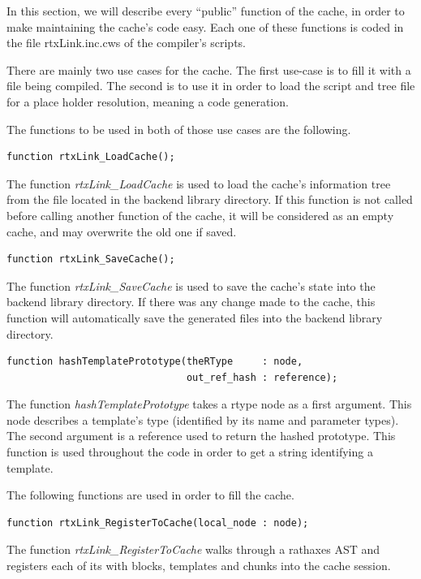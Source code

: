 \documentclass[american]{rtxreport}
\begin{document}
In this section, we will describe every ``public'' function of the cache, in
order to make maintaining the cache's code easy. Each one of these functions is
coded in the file rtxLink.inc.cws of the compiler's scripts.

There are mainly two use cases for the cache. The first use-case is to fill it
with a file being compiled. The second is to use it in order to load the script
and tree file for a place holder resolution, meaning a code generation.

\vspace{20pt}

The functions to be used in both of those use cases are the following.

\begin{lstlisting}
function rtxLink_LoadCache();
\end{lstlisting}
The function \emph{rtxLink\_LoadCache} is used to load the cache's information
tree from the file located in the backend library directory. If this function
is not called before calling another function of the cache, it will be
considered as an empty cache, and may overwrite the old one if saved.

\begin{lstlisting}
function rtxLink_SaveCache();
\end{lstlisting}
The function \emph{rtxLink\_SaveCache} is used to save the cache's state into
the backend library directory. If there was any change made to the cache, this
function will automatically save the generated files into the backend library
directory.

\begin{lstlisting}
function hashTemplatePrototype(theRType     : node,
                               out_ref_hash : reference);
\end{lstlisting}
The function \emph{hashTemplatePrototype} takes a rtype node as a first
argument.  This node describes a template's type (identified by its name and
parameter types). The second argument is a reference used to return the hashed
prototype.  This function is used throughout the code in order to get a string
identifying a template.

\vspace{20pt}

The following functions are used in order to fill the cache.

\begin{lstlisting}
function rtxLink_RegisterToCache(local_node : node);
\end{lstlisting}
The function \emph{rtxLink\_RegisterToCache} walks through a rathaxes AST and
registers each of its with blocks, templates and chunks into the cache session.
\end{document}
